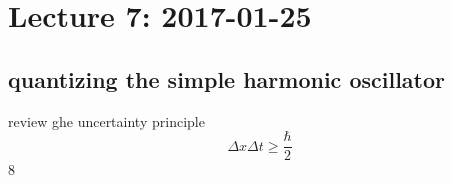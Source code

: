 \documentclass{article}
\begin{document}
\section{Lecture 7: 2017-01-25}
\subsection{quantizing the simple harmonic oscillator}
review ghe uncertainty principle
\begin{equation}
\Delta x \Delta t \geq \frac{\hbar}{2}
\end{equation}8
\end{document}
